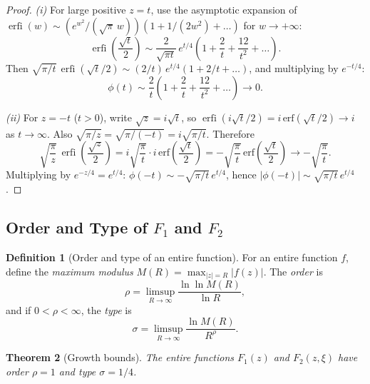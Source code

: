 \documentclass[11pt,a4paper]{article}
\newcommand{\erfi}{\operatorname{erfi}}
\theoremstyle{plain}
\newtheorem{theorem}{Theorem}[section]
\theoremstyle{definition}
\newtheorem{definition}[theorem]{Definition}
\begin{document}
\begin{proof}
\emph{(i)} For large positive $z = t$, use the asymptotic expansion
of $\erfi(w) \sim (e^{w^2}/(\sqrt{\pi}\,w))(1 + 1/(2w^2) + \ldots)$
for $w \to +\infty$:
\begin{equation}
  \erfi\!\left(\frac{\sqrt{t}}{2}\right)
  \sim \frac{2}{\sqrt{\pi t}}\, e^{t/4}
  \left(1 + \frac{2}{t} + \frac{12}{t^2} + \ldots\right).
\end{equation}
Then $\sqrt{\pi/t}\,\erfi(\sqrt{t}/2) \sim (2/t)\, e^{t/4}
(1 + 2/t + \ldots)$, and multiplying by $e^{-t/4}$:
\begin{equation}
  \phi(t) \sim \frac{2}{t}\left(1 + \frac{2}{t} + \frac{12}{t^2}
  + \ldots\right) \to 0.
\end{equation}

\emph{(ii)} For $z = -t$ ($t > 0$), write $\sqrt{z} = i\sqrt{t}$, so
$\erfi(i\sqrt{t}/2) = i\,\mathrm{erf}(\sqrt{t}/2) \to i$
as $t \to \infty$. Also $\sqrt{\pi/z} = \sqrt{\pi/(-t)} = i\sqrt{\pi/t}$.
Therefore
\begin{equation}
  \sqrt{\frac{\pi}{z}}\,\erfi\!\left(\frac{\sqrt{z}}{2}\right)
  = i\sqrt{\frac{\pi}{t}} \cdot i\,\mathrm{erf}\!\left(\frac{\sqrt{t}}{2}\right)
  = -\sqrt{\frac{\pi}{t}}\,\mathrm{erf}\!\left(\frac{\sqrt{t}}{2}\right)
  \to -\sqrt{\frac{\pi}{t}}.
\end{equation}
Multiplying by $e^{-z/4} = e^{t/4}$:
$\phi(-t) \sim -\sqrt{\pi/t}\, e^{t/4}$, hence
$|\phi(-t)| \sim \sqrt{\pi/t}\, e^{t/4}$.
\end{proof}

\subsection{Order and Type of $F_1$ and $F_2$}

\begin{definition}[Order and type of an entire function]
For an entire function $f$, define the \emph{maximum modulus}
$M(R) = \max_{|z|=R} |f(z)|$. The \emph{order} is
\begin{equation}
  \rho = \limsup_{R \to \infty} \frac{\ln \ln M(R)}{\ln R},
\end{equation}
and if $0 < \rho < \infty$, the \emph{type} is
\begin{equation}
  \sigma = \limsup_{R \to \infty} \frac{\ln M(R)}{R^\rho}.
\end{equation}
\end{definition}

\begin{theorem}[Growth bounds]\label{thm:growth}
The entire functions $F_1(z)$ and $F_2(z,\xi)$ have
order $\rho = 1$ and type $\sigma = 1/4$.
\end{theorem}
\end{document}
